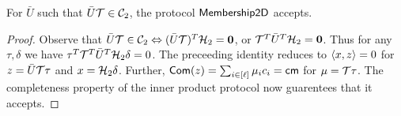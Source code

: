 \begin{lemma}[Completeness]\label{lem:proximity2d_complete}
For $\bar{U}$ such that $\bar{U}\mathcal{T}\in \mathcal{C}_2$, the protocol $\mathsf{Membership2D}$ accepts.
\end{lemma}
\begin{proof}
Observe that $\bar{U}\mathcal{T}\in \mathcal{C}_2 \Leftrightarrow (\bar{U}\mathcal{T})^T\mathcal{H}_2=\bm{0}$, or
$\mathcal{T}^T\bar{U}^T\mathcal{H}_2=\bm{0}$. Thus for any $\tau,\delta$ we have
$\tau^T\mathcal{T}^T\bar{U}^T\mathcal{H}_2\delta=0$. The preceeding identity reduces to
$\langle x,z\rangle=0$ for  $z=\bar{U}\mathcal{T}\tau$ and
$x=\mathcal{H}_2\delta$. Further,
$\mathsf{Com}(z)=\sum_{i\in [\ell]}\mu_ic_i=\mathsf{cm}$ for $\mu=\mathcal{T}\tau$. The
completeness property of the inner product protocol now guarentees that it
accepts.
\end{proof}
 
